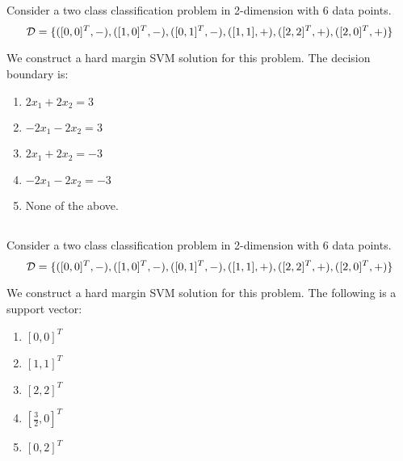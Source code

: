\begin{frame}
\section{}
Consider a two class classification problem in 2-dimension with 6 data points.
\[ {\cal D} = \{([0,0]^T,-), ([1,0]^T,-), ([0,1]^T,-), ([1,1],+), ([2,2]^T,+), ([2,0]^T,+)  \}\]

We construct a hard margin SVM solution for this problem. The decision boundary is:
\begin{enumerate}[label=(\Alph*)]
\item $2x_1 + 2x_2 = 3$   %
\item $-2x_1 - 2x_2 = 3$
\item $2x_1 + 2x_2 = -3$
\item $-2x_1 - 2x_2 = -3$   %
\item None of the above.  %
\end{enumerate}
\end{frame}

\begin{frame}
\section{}
Consider a two class classification problem in 2-dimension with 6 data points.
\[ {\cal D} = \{([0,0]^T,-), ([1,0]^T,-), ([0,1]^T,-), ([1,1],+), ([2,2]^T,+), ([2,0]^T,+)  \}\]

We construct a hard margin SVM solution for this problem. The following is a support vector:

\begin{enumerate}[label=(\Alph*)]
\item $[0,0]^T$
\item $[1,1]^T$   %
\item $[2,2]^T$
\item $[\frac{3}{2},0]^T$
\item $[0,2]^T$
\end{enumerate}
\end{frame}

